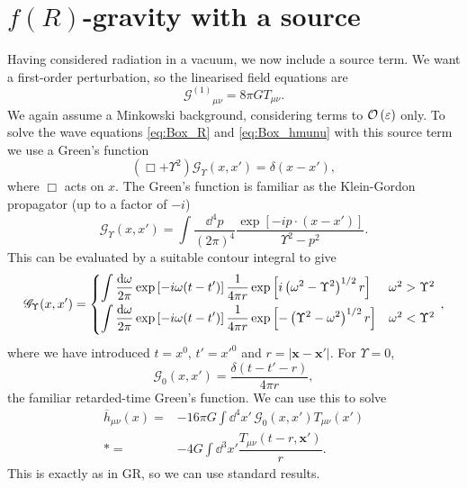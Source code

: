 \section{$f(R)$-gravity with a source}\label{sec:Source}

Having considered radiation in a vacuum, we now include a source term. We want a first-order perturbation, so the linearised field equations are
\begin{equation}
{\mathcal{G}^{(1)}}_{\mu\nu} = 8\pi G T_{\mu\nu}.
\end{equation}
We again assume a Minkowski background, considering terms to $\mathcal{O}\left({\varepsilon}\right)$ only. To solve the wave equations \eqref{eq:Box_R} and \eqref{eq:Box_hmunu} with this source term we use a Green's function
\begin{equation}
\left(\Box + \Upsilon^2\right)\mathscr{G}_\Upsilon(x, x') = \delta(x - x'),
\end{equation}
where $\Box$ acts on $x$. The Green's function is familiar as the Klein-Gordon propagator (up to a factor of $-i$) \citep[section 2.4]{Peskin1995a}
\begin{equation}
\mathscr{G}_\Upsilon(x, x') = \int \dfrac{\dd^4 p}{(2\pi)^4} \dfrac{\exp\left[-ip\cdot(x-x')\right]}{\Upsilon^2 - p^2}.
\end{equation}
This can be evaluated by a suitable contour integral to give
\begin{equation}
\mathscr{G}_\Upsilon(x, x') =
\begin{cases}
{\displaystyle \int{\dfrac{\dd \omega}{2\pi} \exp\left[-i\omega(t-t')\right]\recip{4\pi r}\exp\left[i\left(\omega^2 - \Upsilon^2\right)^{1/2}r\right]}} & \omega^2 > \Upsilon^2\vspace{0.8mm}\\
{\displaystyle \int{\dfrac{\dd \omega}{2\pi} \exp\left[-i\omega(t-t')\right]\recip{4\pi r}\exp\left[-\left(\Upsilon^2 - \omega^2\right)^{1/2}r\right]}} & \omega^2 < \Upsilon^2\vspace{0.8mm}
\end{cases}\, ,
\label{eq:Green}
\end{equation}
where we have introduced $t = x^0$, $t' = x'^0$ and $r = |\boldsymbol{x} - \boldsymbol{x'}|$. For $\Upsilon = 0$,
\begin{equation}
\mathscr{G}_0(x, x') = \dfrac{\delta(t - t' - r)}{4 \pi r},
\end{equation}
the familiar retarded-time Green's function. We can use this to solve 
\begin{align}
\overline{h}_{\mu\nu}(x) = {} & -16 \pi G \int \dd^4 x'\, \mathscr{G}_0(x, x') T_{\mu\nu}(x') \nonumber \\*
 = {} & -4 G \int \dd^3 x' \dfrac{T_{\mu\nu}(t - r, \boldsymbol{x'})}{r}.
\end{align}
This is exactly as in GR, so we can use standard results.

